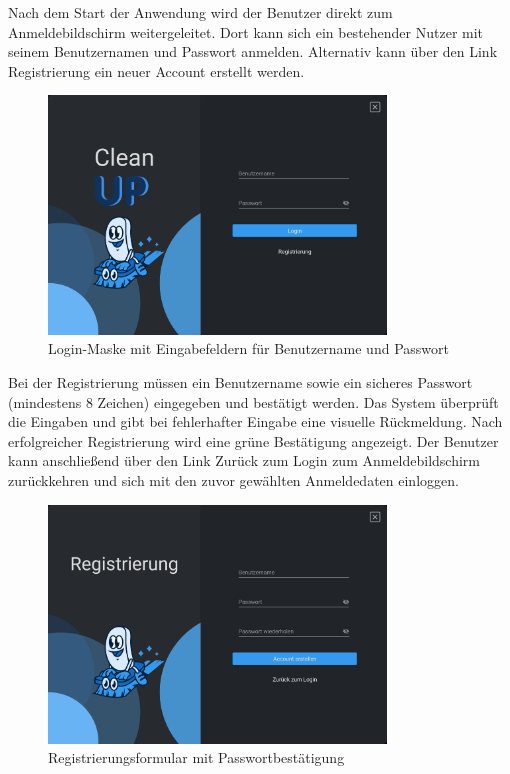 

Nach dem Start der Anwendung wird der Benutzer direkt zum Anmeldebildschirm weitergeleitet. Dort kann sich ein bestehender Nutzer mit seinem Benutzernamen und Passwort anmelden. Alternativ kann über den Link \glqq Registrierung\grqq{} ein neuer Account erstellt werden.

\begin{figure}[H]
    \centering
    \includegraphics[width=0.8\textwidth]{src/screenshot_login.png}
    \caption{Login-Maske mit Eingabefeldern für Benutzername und Passwort}
\end{figure}

Bei der Registrierung müssen ein Benutzername sowie ein sicheres Passwort (mindestens 8 Zeichen) eingegeben und bestätigt werden. Das System überprüft die Eingaben und gibt bei fehlerhafter Eingabe eine visuelle Rückmeldung. Nach erfolgreicher Registrierung wird eine grüne Bestätigung angezeigt. Der Benutzer kann anschließend über den Link \glqq Zurück zum Login\grqq{} zum Anmeldebildschirm zurückkehren und sich mit den zuvor gewählten Anmeldedaten einloggen.

\begin{figure}[H]
    \centering
    \includegraphics[width=0.8\textwidth]{src/screenshot_register.png}
    \caption{Registrierungsformular mit Passwortbestätigung}
\end{figure}

